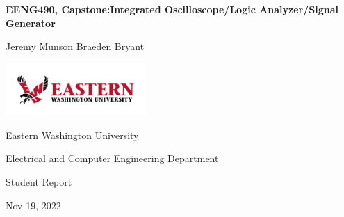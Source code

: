 	\thispagestyle{empty}
	\begin{center}
		\vspace*{1cm}
		\Huge
		\textbf{EENG490, Capstone:\linebreak \linebreak Integrated Oscilloscope/Logic Analyzer/Signal Generator}
		\vspace{0.5cm}
		\LARGE
		\vspace{1.5cm}

		Jeremy Munson
		Braeden
		Bryant

		\vfill

		\includegraphics[width=0.4\textwidth]{EWULogo.png}

		\Large

		Eastern Washington University

		Electrical and Computer Engineering Department

		Student Report

		Nov 19, 2022

	\end{center}
	\newpage
